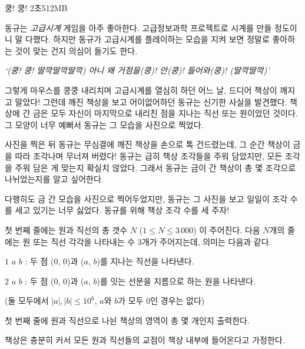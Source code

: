 \begin{problem}{쿵! 쿵!}
{}{}
{2초}{512MB}{}

동규는 \textit{고급시계} 게임을 아주 좋아한다. 고급정보과학 프로젝트로 시계를 만들 정도이니 말 다했다. 하지만 동규가 고급시계를 플레이하는 모습을 지켜 보면 정말로 좋아하는 것이 맞는 건지 의심이 들기도 한다.

\textit{`(쿵! 쿵! 딸깍딸깍딸깍) 아니 왜 거점을(쿵)! 안(쿵)! 들어와(쿵)! (딸깍딸깍)'}

그렇게 마우스를 쿵쿵 내리치며 고급시계를 열심히 하던 어느 날, 드디어 책상이 깨지고 말았다! 그런데 깨진 책상을 보고 어이없어하던 동규는 신기한 사실을 발견했다. 책상에 간 금은 모두 자신이 마지막으로 내리친 점을 지나는 직선 또는 원이었던 것이다. 그 모양이 너무 예뻐서 동규는 그 모습을 사진으로 찍었다.

사진을 찍은 뒤 동규는 무심결에 깨진 책상을 손으로 톡 건드렸는데, 그 순간 책상이 금을 따라 조각나며 무너져 버렸다! 동규는 급히 책상 조각들을 주워 담았지만, 모든 조각을 주워 담은 게 맞는지 확실치 않았다. 그래서 동규는 금이 간 책상이 총 몇 조각으로 나뉘었는지를 알고 싶어한다.

다행히도 금 간 모습을 사진으로 찍어두었지만, 동규는 그 사진을 보고 일일이 조각 수를 세고 있기는 너무 싫었다. 동규를 위해 책상 조각 수를 세 주자!

\InputFile

첫 번째 줄에는 원과 직선의 총 갯수 $N$ ($1 \le N \le 3\, 000$) 이 주어진다.
다음 $N$개의 줄에는 원 또는 직선 각각을 나타내는 수 $3$개가 주어지는데, 의미는 다음과 같다.

$1$ $a$ $b$ : 두 점 ($0$, $0$)과 ($a$, $b$)를 지나는 직선을 나타낸다. 

$2$ $a$ $b$ : 두 점 ($0$, $0$)과 ($a$, $b$)를 잇는 선분을 지름으로 하는 원을 나타낸다.

(둘 모두에서 $|a|, |b| \le 10^{6}$, $a$와 $b$가 모두 $0$인 경우는 없다)

\OutputFile

첫 번째 줄에 원과 직선으로 나뉜 책상의 영역이 총 몇 개인지 출력한다.

책상은 충분히 커서 모든 원과 직선들의 교점이 책상 내부에 들어온다고 가정한다.

\Examples
	
\begin{example}
%
\end{example}

\blankpage

\end{problem}
